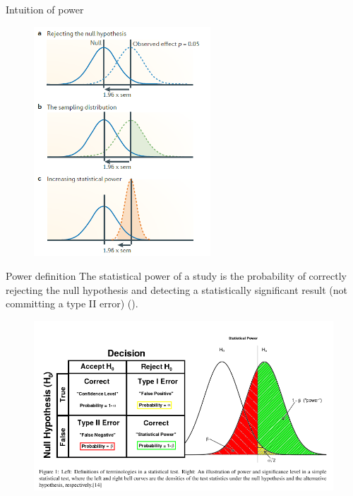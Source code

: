 \documentclass{beamer}
\begin{document}
    \begin{frame}{Intuition of power}
    	\begin{figure}[H]
    		\centering
    		\includegraphics[width=0.59\textwidth]{pics/power intuitive graph.png}
    	\end{figure}
    \end{frame}
    
    \begin{frame}{Power definition}
    	\fontsize{10pt}{12pt}\selectfont
    	The statistical power of a study is the probability of correctly rejecting the null hypothesis and detecting a statistically significant result (not committing a type II error) (\cite{wheeler2014}).
    	\begin{figure}[H]
    		\centering
    		\includegraphics[width=1\textwidth]{pics/power.png}
    	\end{figure}
    \end{frame}
    
\end{document}
